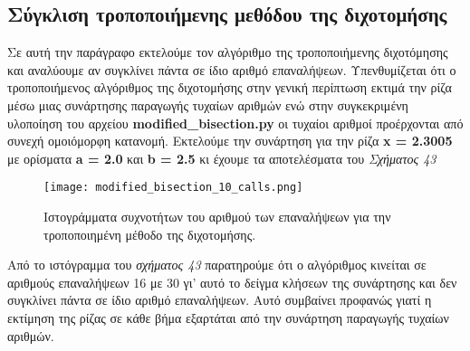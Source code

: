 \documentclass[First Project.tex]{subfiles}
\begin{document}
\subsection{ Σύγκλιση τροποποιήμενης μεθόδου της διχοτομήσης }

Σε αυτή την παράγραφο εκτελούμε τον αλγόριθμο της τροποποιήμενης διχοτόμησης και αναλύουμε αν συγκλίνει πάντα σε ίδιο αριθμό επαναλήψεων.
Υπενθυμίζεται ότι ο τροποποιήμενος αλγόριθμος της διχοτομήσης στην γενική περίπτωση εκτιμά την ρίζα μέσω μιας συνάρτησης παραγωγής τυχαίων
αριθμών ενώ στην συγκεκριμένη υλοποίηση του αρχείου \textlatin{\textbf{modified\_bisection.py}} οι τυχαίοι αριθμοί προέρχονται από συνεχή
ομοιόμορφη κατανομή. Εκτελούμε την συνάρτηση για την ρίζα \textbf{\textlatin{x = 2.3005}} με ορίσματα \textlatin{\textbf{a = 2.0}} και
\textlatin{\textbf{b = 2.5}} κι έχουμε τα αποτελέσματα του \textit{Σχήματος 43}

\begin{figure}[h!]
    \centering
    \captionsetup{justification=centering}
    \begin{center}
        \texttt{[image: modified\_bisection\_10\_calls.png]}    
        \caption{ Ιστογράμματα συχνοτήτων του αριθμού των επαναλήψεων για την τροποποιημένη μέθοδο της διχοτομήσης. }
    \end{center}
\end{figure}

Από το ιστόγραμμα του \textit{σχήματος 43} παρατηρούμε ότι ο αλγόριθμος κινείται σε αριθμούς επαναλήψεων 16 με 30 γι' αυτό το δείγμα κλήσεων της
συνάρτησης και δεν συγκλίνει πάντα σε ίδιο αριθμό επαναλήψεων. Αυτό συμβαίνει προφανώς γιατί η εκτίμηση της ρίζας σε κάθε βήμα εξαρτάται από 
την συνάρτηση παραγωγής τυχαίων αριθμών. 
\end{document}
